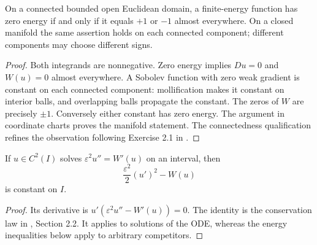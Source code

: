 \begin{proposition}\label{prop:phase-zero-energy}
On a connected bounded open Euclidean domain, a finite-energy function has zero energy if and only if it equals $+1$ or $-1$ almost everywhere. On a closed manifold the same assertion holds on each connected component; different components may choose different signs.
\end{proposition}
\begin{proof}
Both integrands are nonnegative. Zero energy implies $Du=0$ and $W(u)=0$ almost everywhere. A Sobolev function with zero weak gradient is constant on each connected component: mollification makes it constant on interior balls, and overlapping balls propagate the constant. The zeros of $W$ are precisely $\pm1$. Conversely either constant has zero energy. The argument in coordinate charts proves the manifold statement. The connectedness qualification refines the observation following Exercise 2.1 in \cite{ChAC}.
\end{proof}

\begin{lemma}\label{lem:phase-hamiltonian}
If $u\in C^2(I)$ solves $\varepsilon^2u''=W'(u)$ on an interval, then
\[
 \frac{\varepsilon^2}{2}(u')^2-W(u)
\]
is constant on $I$.
\end{lemma}
\begin{proof}
Its derivative is $u'(\varepsilon^2u''-W'(u))=0$. The identity is the conservation law in \cite{ChAC}, Section 2.2. It applies to solutions of the ODE, whereas the energy inequalities below apply to arbitrary competitors.
\end{proof}

